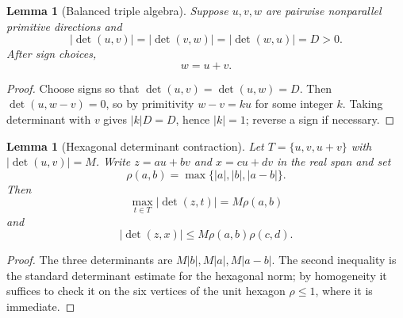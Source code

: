 \documentclass[11pt]{article}
\newtheorem{lemma}[theorem]{Lemma}
\theoremstyle{definition}
\begin{document}
\begin{lemma}[Balanced triple algebra]\label{lem:balanced-algebra}
Suppose $u,v,w$ are pairwise nonparallel primitive directions and
\[
|\det(u,v)|=|\det(v,w)|=|\det(w,u)|=D>0.
\]
After sign choices,
\[
\boxed{w=u+v.}
\]
\end{lemma}
\begin{proof}
Choose signs so that $\det(u,v)=\det(u,w)=D$.  Then $\det(u,w-v)=0$, so by primitivity $w-v=ku$ for some integer $k$.  Taking determinant with $v$ gives $|k|D=D$, hence $|k|=1$; reverse a sign if necessary.
\end{proof}

\begin{lemma}[Hexagonal determinant contraction]\label{lem:hex-contraction}
Let $T=\{u,v,u+v\}$ with $|\det(u,v)|=M$.  Write $z=au+bv$ and $x=cu+dv$ in the real span and set
\[
\rho(a,b)=\max\{|a|,|b|,|a-b|\}.
\]
Then
\[
\max_{t\in T}|\det(z,t)|=M\rho(a,b)
\]
and
\[
|\det(z,x)|\le M\rho(a,b)\rho(c,d).
\]
\end{lemma}
\begin{proof}
The three determinants are $M|b|,M|a|,M|a-b|$.  The second inequality is the standard determinant estimate for the hexagonal norm; by homogeneity it suffices to check it on the six vertices of the unit hexagon $\rho\le1$, where it is immediate.
\end{proof}
\end{document}
